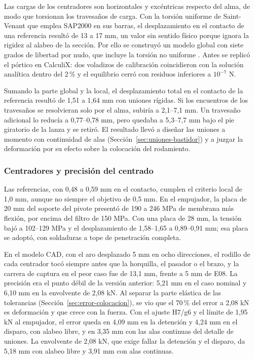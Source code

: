 Las cargas de los centradores son horizontales y excéntricas respecto del alma, de modo que torsionan los travesaños de carga. Con la torsión uniforme de Saint-Venant que emplea SAP2000 en sus barras, el desplazamiento en el contacto de una referencia resultó de 13 a 17 mm, un valor sin sentido físico porque ignora la rigidez al alabeo de la sección. Por ello se construyó un modelo global con siete grados de libertad por nudo, que incluye la torsión no uniforme \cite{aiscdg9}. Antes se replicó el pórtico en CalculiX: dos voladizos de calibración coincidieron con la solución analítica dentro del 2\,\% y el equilibrio cerró con residuos inferiores a $10^{-7}$ N.

Sumando la parte global y la local, el desplazamiento total en el contacto de la referencia resultó de 1,51 a 1,64 mm con uniones rígidas. Si los encuentros de los travesaños se resolvieran solo por el alma, subiría a 2,1--7,1 mm. Un travesaño adicional lo reducía a 0,77--0,78 mm, pero quedaba a 5,3--7,7 mm bajo el pie giratorio de la lanza y se retiró. El resultado llevó a diseñar las uniones a momento con continuidad de alas (Sección~\ref{sec:uniones-bastidor}) y a juzgar la deformación por su efecto sobre la colocación del rodamiento.

\subsubsection{Centradores y precisión del centrado}

Las referencias, con 0,48 a 0,59 mm en el contacto, cumplen el criterio local de 1,0 mm, aunque no siempre el objetivo de 0,5 mm. En el empujador, la placa de 20 mm del soporte del pivote presentó de 190 a 246 MPa de membrana más flexión, por encima del filtro de 150 MPa. Con una placa de 28 mm, la tensión bajó a 102--129 MPa y el desplazamiento de 1,58--1,65 a 0,89--0,91 mm; esa placa se adoptó, con soldaduras a tope de penetración completa.

En el modelo CAD, con el aro desplazado 5 mm en ocho direcciones, el rodillo de cada centrador tocó siempre antes que la horquilla, el pasador o el brazo, y la carrera de captura en el peor caso fue de 13,1 mm, frente a 5 mm de E08. La precisión era el punto débil de la versión anterior: 5,21 mm en el caso nominal y 6,10 mm en la envolvente de 2,08 kN. Al separar la parte elástica de las tolerancias (Sección~\ref{sec:error-colocacion}), se vio que el 70\,\% del error a 2,08 kN es deformación y que crece con la fuerza. Con el ajuste H7/g6 y el límite de 1,95 kN al empujador, el error queda en 4,09 mm en la detención y 4,24 mm en el disparo, con alabeo libre, y en 3,35 mm con las alas continuas del detalle de uniones. La envolvente de 2,08 kN, que exige fallar la detención y el disparo, da 5,18 mm con alabeo libre y 3,91 mm con alas continuas.

